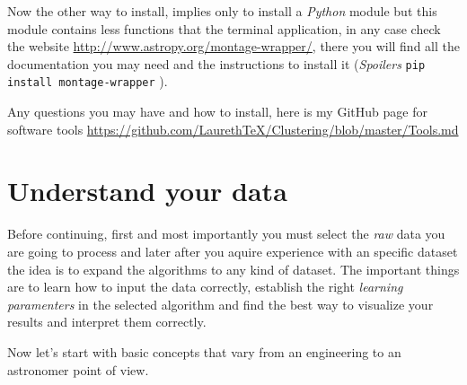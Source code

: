 \documentclass[11pt,fleqn]{book} %
\begin{document}
\begin{description}
\begin{enumerate}
    \end{enumerate}
    
    
    
      Now the other way to install, implies only to install a \emph{Python} module but this module contains less functions that the terminal application, in any case check the website \url{http://www.astropy.org/montage-wrapper/}, there you will find all the documentation you may need and the instructions to install it (\emph{Spoilers} \verb|pip install montage-wrapper| ).\\
\end{description}

Any questions you may have and how to install, here is my GitHub page for software tools \url{https://github.com/LaurethTeX/Clustering/blob/master/Tools.md}


\chapter{Understand your data}

Before continuing, first and most importantly you must select the \emph{raw} data you are going to process and later after you aquire experience with an specific dataset the idea is to expand the algorithms to any kind of dataset. The important things are to learn how to input the data correctly, establish the right \emph{learning paramenters} in the selected algorithm and find the best way to visualize your results and interpret them correctly.

Now let's start with basic concepts that vary from an engineering to an astronomer point of view.
\end{document}

